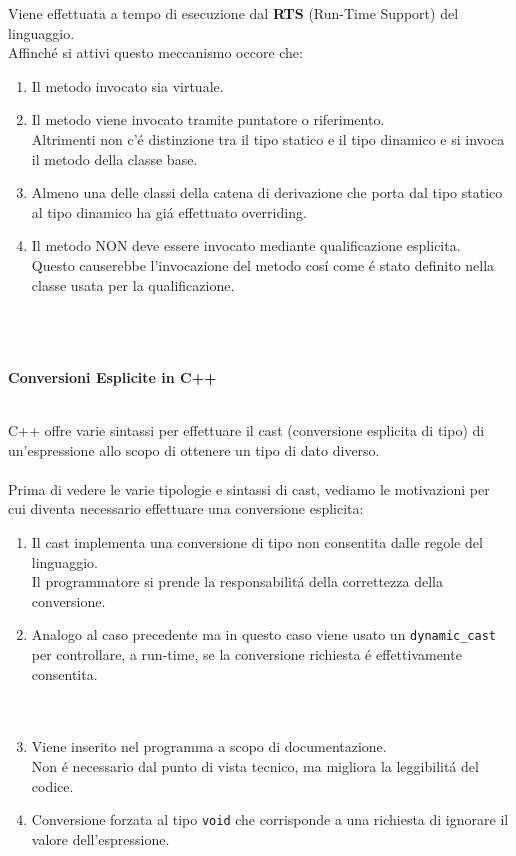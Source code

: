 \documentclass{article}
\begin{document}
Viene effettuata a tempo di esecuzione dal \textbf{RTS} (Run-Time Support) del linguaggio.\\Affinch\'e si attivi questo meccanismo occore che: \\
\begin{enumerate}
\item Il metodo invocato sia virtuale. \\
\item Il metodo viene invocato tramite puntatore o riferimento. \\ Altrimenti non c'\'e distinzione tra il tipo statico e il tipo dinamico e si invoca il metodo della classe base. \\
\item Almeno una delle classi della catena di derivazione che porta dal tipo statico al tipo dinamico ha gi\'a effettuato overriding. \\
\item Il metodo NON deve essere invocato mediante qualificazione esplicita.\\ Questo causerebbe l'invocazione del metodo cos\'i come \'e stato definito nella classe usata per la qualificazione.
\\ \\ \\ \\
\end{enumerate}
\begin{large}\textbf{\textcolor{blu}{Conversioni Esplicite in C++}} \\ \\ \end{large}
C++ offre varie sintassi per effettuare il cast (conversione esplicita di tipo) di un'espressione allo scopo di ottenere un tipo di dato diverso.\\ \\
Prima di vedere le varie tipologie e sintassi di cast, vediamo le motivazioni per cui diventa necessario effettuare una conversione esplicita: \\
\begin{enumerate}
\item Il cast implementa una conversione di tipo non consentita dalle regole del linguaggio.\\Il programmatore si prende la responsabilit\'a della correttezza della conversione.\\
\item Analogo al caso precedente ma in questo caso viene usato un \texttt{dynamic\_cast} per controllare, a run-time, se la conversione richiesta \'e effettivamente consentita.\\ \\ \\
\item Viene inserito nel programma a scopo di documentazione.\\Non \'e necessario dal punto di vista tecnico, ma migliora la leggibilit\'a del codice.\\
\item Conversione forzata al tipo \texttt{void} che corrisponde a una richiesta di ignorare il valore dell'espressione.\\
\end{enumerate}
\end{document}
